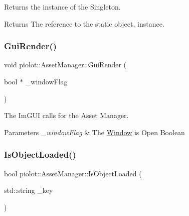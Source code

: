 Returns the instance of the Singleton. 

\begin{DoxyReturn}{Returns}
The reference to the static object, instance. 
\end{DoxyReturn}
\mbox{\label{classpiolot_1_1_asset_manager_a00d1b6635e14cfdf2a618fff3ad61416}} 
\subsubsection{\texorpdfstring{Gui\+Render()}{GuiRender()}}
{\footnotesize\ttfamily void piolot\+::\+Asset\+Manager\+::\+Gui\+Render (\begin{DoxyParamCaption}\item[{bool $\ast$}]{\+\_\+window\+Flag }\end{DoxyParamCaption})\hspace{0.3cm}{\ttfamily [inline]}}



The Im\+G\+UI calls for the Asset Manager. 


\begin{DoxyParams}{Parameters}
{\em \+\_\+window\+Flag} & The \mbox{\hyperlink{class_window}{Window}} is Open Boolean \\
\hline
\end{DoxyParams}
\mbox{\label{classpiolot_1_1_asset_manager_a120535d011b245328a45a1d85f181cc0}} 
\subsubsection{\texorpdfstring{Is\+Object\+Loaded()}{IsObjectLoaded()}}
{\footnotesize\ttfamily bool piolot\+::\+Asset\+Manager\+::\+Is\+Object\+Loaded (\begin{DoxyParamCaption}\item[{std\+::string}]{\+\_\+key }\end{DoxyParamCaption})\hspace{0.3cm}{\ttfamily [inline]}}



